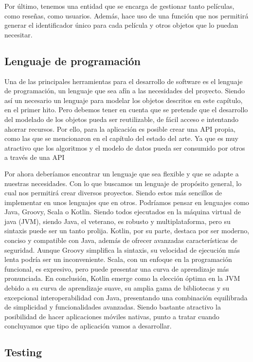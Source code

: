 Por último, tenemos una entidad que se encarga de gestionar tanto películas, como reseñas, como 
usuarios. Además, hace uso de una función que nos permitirá generar el identificador único para cada 
película y otros objetos que lo puedan necesitar.

\subsection{Lenguaje de programación}

Una de las principales herramientas para el desarrollo de software es el lenguaje de programación, un 
lenguaje que sea afín a las necesidades del proyecto. Siendo así un necesario un lenguaje para modelar 
los objetos descritos en este capítulo, en el primer hito. Pero debemos tener en cuenta que se pretende 
que el desarrollo del modelado de los objetos pueda ser reutilizable, de fácil acceso e intentando 
ahorrar recursos. Por ello, para la aplicación es posible crear una API propia, como las que se 
mencionaron en el capítulo del estado del arte. Ya que es muy atractivo que los algoritmos y el modelo 
de datos pueda ser consumido por otros a través de una API

Por ahora deberíamos encontrar un lenguaje que sea flexible y que se adapte a nuestras necesidades. Con 
lo que buscamos un lenguaje de propósito general, lo cual nos permitirá crear diversos proyectos. 
Siendo estos más sencillos de implementar en unos lenguajes que en otros. Podríamos pensar en lenguajes 
como Java, Groovy, Scala o Kotlin. Siendo todos ejecutados en la máquina virtual de java (JVM), siendo 
Java, el veterano, es robusto y multiplataforma, pero su sintaxis puede ser un tanto prolija. Kotlin, 
por su parte, destaca por ser moderno, conciso y compatible con Java, además de ofrecer avanzadas 
características de seguridad. Aunque Groovy simplifica la sintaxis, su velocidad de ejecución más lenta 
podría ser un inconveniente. Scala, con un enfoque en la programación funcional, es expresivo, pero 
puede presentar una curva de aprendizaje más pronunciada. En conclusión, Kotlin emerge como la elección 
óptima en la JVM debido a su curva de aprendizaje suave, su amplia gama de bibliotecas y su excepcional 
interoperabilidad con Java, presentando una combinación equilibrada de simplicidad y funcionalidades 
avanzadas. Siendo bastante atractivo la posibilidad de hacer aplicaciones móviles nativas, punto a 
tratar cuando concluyamos que tipo de aplicación vamos a desarrollar.

\subsection{Testing}

